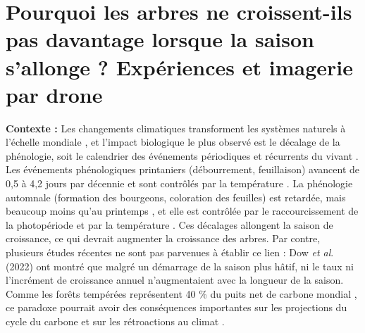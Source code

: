 \documentclass[12pt]{article}
\begin{document}
\pagestyle{fancy}
\fancyhf{} %
\fancyfoot[C]{\thepage}
\renewcommand{\headrulewidth}{0pt}




\section*{Pourquoi les arbres ne croissent-ils pas davantage lorsque la saison s'allonge ? Expériences et imagerie par drone}

\textbf{Contexte :} Les changements climatiques transforment les systèmes naturels à l'échelle mondiale \cite{parmesan_poleward_1999,rosenzweig_attributing_2008}, et l'impact biologique le plus observé est le décalage de la phénologie, soit le calendrier des événements périodiques et récurrents du vivant \cite{parmesan_globally_2003,cleland_shifting_2007,lieth_phenology_1974,woolway_phenological_2021,menzel_european_2006}. Les événements phénologiques printaniers (débourrement, feuillaison) avancent de 0,5 \cite{wolfe_climate_2005} à 4,2 jours par décennie \cite{chmielewski_response_2001,fu_recent_2014} et sont contrôlés par la température \cite{chuine_why_2010,cleland_shifting_2007,penuelas_responses_2001}. La phénologie automnale (formation des bourgeons, coloration des feuilles) est retardée, mais beaucoup moins qu'au printemps \cite{gallinat_autumn_2015,jeong_macroscale_2014}, et elle est contrôlée par le raccourcissement de la photopériode \cite{cooke_dynamic_2012,flynn_temperature_2018,korner_phenology_2010} et par la température \cite{cooke_dynamic_2012,delpierre_temperate_2016}. Ces décalages allongent la saison de croissance, ce qui devrait augmenter la croissance des arbres. Par contre, plusieurs études récentes ne sont pas parvenues à établir ce lien \cite{dow_warm_2022,silvestro_longer_2023,matula_shifts_2023,charletdesauvage_temperature_2022,cabon_crossbiome_2022} : Dow \textit{et al}. (2022) ont montré que malgré un démarrage de la saison plus hâtif, ni le taux ni l'incrément de croissance annuel n'augmentaient avec la longueur de la saison. Comme les forêts tempérées représentent 40 \% du puits net de carbone mondial \cite{gibbs_revised_2025}, ce paradoxe pourrait avoir des conséquences importantes sur les projections du cycle du carbone et sur les rétroactions au climat \cite{richardson_climate_2013,swidrak_comparing_2013}.
\end{document}
